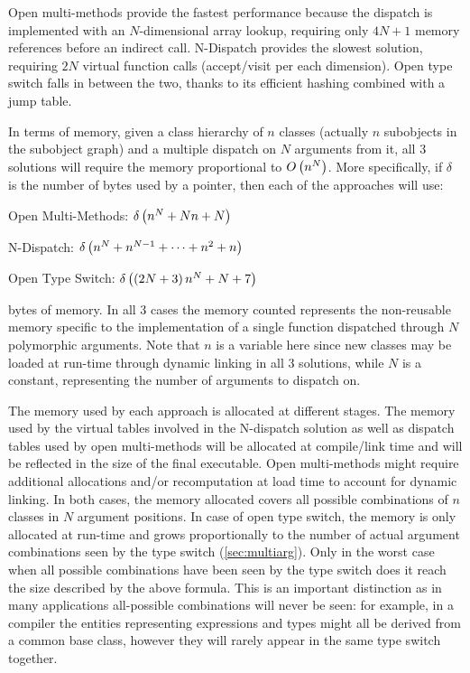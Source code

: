 Open multi-methods provide the fastest performance because the dispatch is 
implemented with an $N$-dimensional array lookup, requiring only $4N+1$ memory 
references before an indirect call. N-Dispatch provides the slowest solution, 
requiring $2N$ virtual function calls (accept/visit per each dimension). Open 
type switch falls in between the two, thanks to its efficient hashing combined 
with a jump table.

In terms of memory, given a class hierarchy of $n$ classes (actually $n$ subobjects in 
the subobject graph) and a multiple dispatch on $N$ arguments 
from it, all 3 solutions will require the memory proportional to $O\left(n^N\right)$. 
More specifically, if $\delta$ is the number of bytes used by a pointer, then 
each of the approaches will use:

\begin{compactitem}
\setlength{\itemsep}{0pt}
\setlength{\parskip}{0pt}
\item Open Multi-Methods: $\delta\left(n^N+Nn+N\right)$
\item N-Dispatch: $\delta\left(n^N+n^{N-1}+\cdots+n^2+n\right)$
\item Open Type Switch: $\delta\left(\left(2N+3\right)n^N+N+7\right)$
\end{compactitem}

\noindent
bytes of memory. In all 3 cases the memory counted represents the non-reusable 
memory specific to the implementation of a single function dispatched through 
$N$ polymorphic arguments. Note that $n$ is a variable here since new classes 
may be loaded at run-time through dynamic linking in all 3 solutions, while $N$ 
is a constant, representing the number of arguments to dispatch on.

The memory used by each approach is allocated at different stages. The memory 
used by the virtual tables involved in the N-dispatch solution as well as 
dispatch tables used by open multi-methods will be allocated at compile/link 
time and will be reflected in the size of the final executable. Open 
multi-methods might require additional allocations and/or recomputation at load 
time to account for dynamic linking. In both cases, the memory allocated covers 
all possible combinations of $n$ classes in $N$ argument positions. In case of 
open type switch, the memory is only allocated at run-time and grows proportionally 
to the number of actual argument combinations seen by the type switch 
(\textsection\ref{sec:multiarg}). Only in the worst case when all possible 
combinations have been seen by the type switch does it reach the size described 
by the above formula. This is an important distinction as in many applications 
all-possible combinations will never be seen: for example, in a compiler the 
entities representing expressions and types might all be derived from a common 
base class, however they will rarely appear in the same type switch together.

